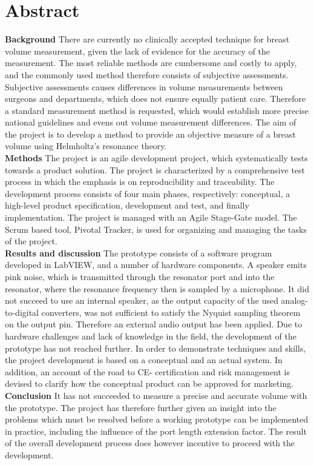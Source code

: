 \section{Abstract}

\textbf{Background} There are currently no clinically accepted technique for breast volume measurement, given the lack of evidence for the accuracy of the measurement. The most reliable methods are cumbersome and costly to apply, and the commonly used method therefore consists of subjective assessments. Subjective assessments causes differences in volume measurements between surgeons and departments, which does not ensure equally patient care.  Therefore a standard measurement method is requested, which would establish more precise national guidelines and evens out volume measurement differences. The aim of the project is to develop a method to provide an objective measure of a breast volume using Helmholtz's resonance theory.\\
\textbf{Methods} The project is an agile development project, which systematically tests towards a product solution. The project is characterized by a comprehensive test process in which the emphasis is on reproducibility and traceability. The development process consists of four main phases, respectively: conceptual, a high-level product specification, development and test, and finally implementation. The project is managed with an Agile Stage-Gate model. The Scrum based tool, Pivotal Tracker, is used for organizing and managing the tasks of the project. \\
\textbf{Results and discussion} The prototype consists of a software program developed in LabVIEW, and a number of hardware components. A speaker emits pink noise, which is transmitted through the resonator port and into the resonator, where the resonance frequency then is sampled by a microphone. It did not succeed to use an internal speaker, as the output capacity of the used analog-to-digital converters, was not sufficient to satisfy the Nyquist sampling theorem on the output pin. Therefore an external audio output has been applied. Due to hardware challenges and lack of knowledge in the field, the development of the prototype has not reached further. In order to demonstrate techniques and skills, the project development is based on a conceptual and an actual system. In addition, an account of the road to CE- certification and risk management is devised to clarify how the conceptual product can be approved for marketing.\\
\textbf{Conclusion} It has not succeeded to measure a precise and accurate volume with the prototype. The project has therefore further given an insight into the problems which must be resolved before a working prototype can be implemented in practice, including the influence of the port length extension factor. The result of the overall development process does however incentive to proceed with the development.
    